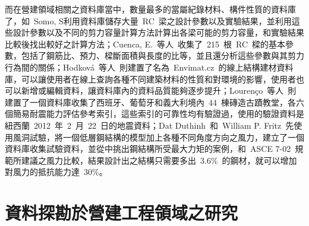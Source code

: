 而在營建領域相關之資料庫當中，數量最多的當屬紀錄材料、構件性質的資料庫了，如~Somo, S\cite{somo2006modeling}利用資料庫儲存大量~RC~梁之設計參數以及實驗結果，並利用這些設計參數以及不同的剪力容量計算方法計算出各梁可能的剪力容量，和實驗結果比較後找出較好之計算方法；Cuenca, E.~等人\cite{Cuenca20131089}~收集了~215~根~RC~樑的基本參數，包括了鋼筋比、預力、樑斷面積與長度的比等，並且還分析這些參數與其剪力行為間的關係；Hodkov{\'a}~等人\cite{hodkova2011envimat}~則建置了名為~Envimat.cz~的線上結構建材資料庫，可以讓使用者在線上查詢各種不同建築材料的性質和對環境的影響，使用者也可以新增或編輯資料，讓資料庫內的資料品質能夠逐步提升；Louren{\c{c}}o~等人\cite{lourencco2013simplified}~則建置了一個資料庫收集了西班牙、葡萄牙和義大利境內~44~棟磚造古蹟教堂，各六個簡易耐震能力評估參考索引，這些索引的可靠性均有驗證過，使用的驗證資料是紐西蘭~2012~年~2~月~22~日的地震資料；Dat Duthinh~和~William P. Fritz\cite{duthinh2006nonlinear}~先使用風洞試驗，將一個低層鋼結構的模型加上各種不同角度方向之風力，建立了一個資料庫收集試驗資料，並從中挑出鋼結構所受最大力矩的案例，和~ASCE 7-02\cite{asce2002minimum}~規範所建議之風力比較，結果設計出之結構只需要多出~3.6\%~的鋼材，就可以增加對風力的抵抗能力達~30\%。


\section{資料探勘於營建工程領域之研究}

